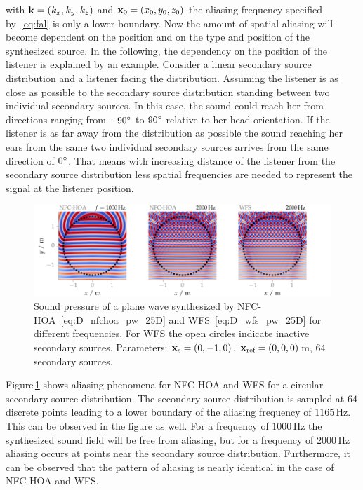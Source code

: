  with $\mathbf{k} = (k_x,k_y,k_z)$ and $\mathbf{x}_0 = (x_0,y_0,z_0)$ the
aliasing frequency specified by~\eqref{eq:fal} is only a lower boundary. Now
the amount of spatial aliasing will become dependent on the
position and on the type and position of the synthesized source. In the
following, the dependency
on the position of the listener is explained by an example. Consider
a linear secondary source distribution and a listener facing the
distribution. Assuming the listener is as close as
possible to the secondary source distribution standing between two individual
secondary sources. In this case, the sound could reach her
from directions ranging from $-90^\circ$ to $90^\circ$ relative to her head
orientation. If the
listener is as far away from the distribution as possible the sound reaching her
ears from the same two individual secondary sources
arrives from the same direction of $0^\circ$. That means with increasing
distance of the listener from the secondary source distribution
less spatial frequencies are needed to represent the signal at the listener
position.

%
\begin{figure}[t]
    \includegraphics{fig3_08/fig3_08}
    \caption{Sound pressure of a plane wave synthesized by
    \ac{NFC-HOA}~\protect\eqref{eq:D_nfchoa_pw_25D} and
    \ac{WFS}~\protect\eqref{eq:D_wfs_pw_25D} for different frequencies.
    For \ac{WFS} the open circles indicate inactive secondary sources.
    Parameters: $\mathbf{x}_\text{s} = (0,-1,0)$, $\mathbf{x}_\text{ref} = (0,0,0)$\,m, 64 secondary sources. 
    }
    \label{fig:aliasing}
\end{figure}
%
Figure\,\ref{fig:aliasing} shows aliasing phenomena for \ac{NFC-HOA} and
\ac{WFS} for a
circular secondary source distribution. The secondary source distribution
is sampled at $64$
discrete points leading to a lower boundary of the aliasing frequency of
$1165$\,Hz. This can be observed in the figure as well. For a frequency of
$1000$\,Hz the synthesized sound field will be free from aliasing, but for a
frequency of $2000$\,Hz aliasing occurs at points near the secondary source
distribution. Furthermore, it can be observed that the pattern of aliasing is nearly
identical in the case of \ac{NFC-HOA} and \ac{WFS}. 

